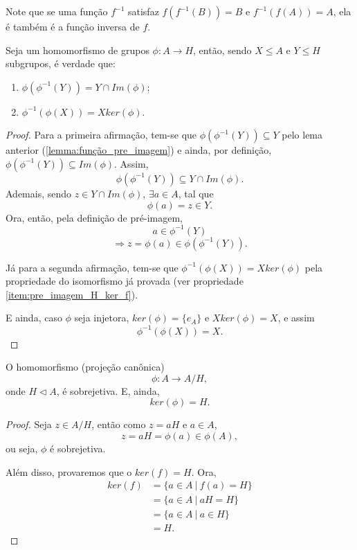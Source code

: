 \documentclass[11pt,openany]{book}
\begin{document}
     Note que se uma função $f^{-1}$ satisfaz $f(f^{-1}(B)) = B$ e $f^{-1}(f(A)) = A$, ela é também é a função inversa de $f$.

     \begin{lemma}
     \label{lemma:homomorfismo_pre_imagem}
        Seja um homomorfismo de grupos $\phi:A\rightarrow H$, então, sendo $X \leq A$ e $Y \leq H$ subgrupos, é verdade que:
        \begin{enumerate}
            \item $\phi(\phi^{-1}(Y)) = Y \cap Im(\phi)$;
            \item $\phi^{-1}(\phi(X)) = X ker(\phi)$.
        \end{enumerate}
     \end{lemma}

     \begin{proof}
         Para a primeira afirmação, tem-se que $\phi(\phi^{-1}(Y)) \subseteq Y$ pelo lema anterior (\ref{lemma:função_pre_imagem}) e ainda, por definição, $\phi(\phi^{-1}(Y)) \subseteq Im(\phi)$. Assim, \[\phi(\phi^{-1}(Y)) \subseteq Y \cap Im(\phi).\]
         Ademais, sendo $z \in Y \cap Im(\phi)$, $\exists a \in A$, tal que
         \[\phi(a) = z \in Y.\]
         Ora, então, pela definição de pré-imagem,
         \[a \in \phi^{-1}(Y)\]
         \[\Rightarrow z = \phi(a) \in \phi(\phi^{-1}(Y)).\]
         

         Já para a segunda afirmação, tem-se que $\phi^{-1}(\phi(X)) = X ker(\phi)$ pela propriedade do isomorfismo já provada (ver propriedade \ref{item:pre_imagem_H_ker_f}).
         
         E ainda, caso $\phi$ seja injetora, $ker(\phi) = \{e_A\}$ e $X ker(\phi) = X$, e assim
         \[\phi^{-1}(\phi(X)) = X.\]
         
     \end{proof}

     \begin{lemma}
    \label{lemma:projecao_canonica_sobrejetora}
        O homomorfismo (projeção canônica)
        \[\phi: A \rightarrow A/H,\]
        onde $H \triangleleft A$, é sobrejetiva.
        E, ainda,
        \[ker(\phi) = H.\]
     \end{lemma}

     \begin{proof}
         Seja $z \in A/H$, então como $z = aH$ e $a \in A$,
         \[z = aH = \phi(a) \in \phi(A),\]
         ou seja, $\phi$ é sobrejetiva.

         Além disso, provaremos que o $ker(f) = H$. Ora,
         \begin{align*}
             ker(f) &= \{a \in A \ | \ f(a) = H\}\\ 
             &= \{a \in A \ | \ aH = H\}\\ 
             &= \{a \in A \ | \ a \in H\}\\
             &= H.
         \end{align*}
     \end{proof}
\end{document}
